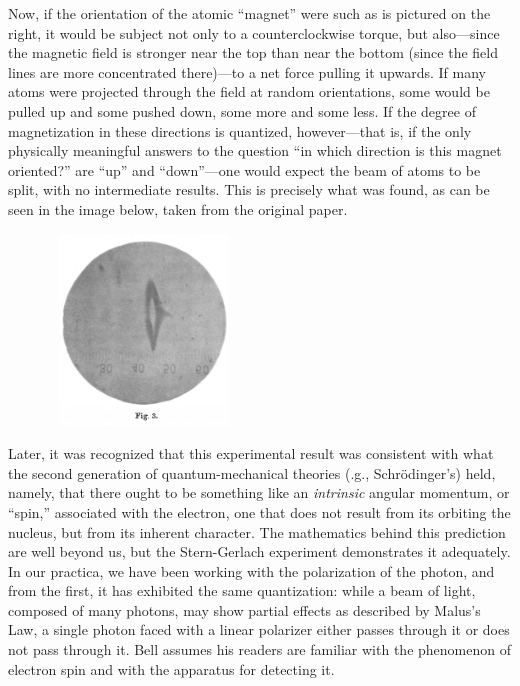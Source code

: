 Now, if the orientation of the atomic ``magnet'' were such as is pictured on the right, it would be subject not only to a counterclockwise torque, but also---since the magnetic field is stronger near the top than near the bottom (since the field lines are more concentrated there)---to a net force pulling it upwards. If many atoms were projected through the field at random orientations, some would be pulled up and some pushed down, some more and some less. If the degree of magnetization in these directions is quantized, however---that is, if the only physically meaningful answers to the question ``in which direction is this magnet oriented?'' are ``up'' and ``down''---one would expect the beam of atoms to be split, with no intermediate results. This is precisely what was found, as can be seen in the image below, taken from the original paper.

\begin{figure}[h]
  \centering
    \includegraphics[width=2.00000in,height=2.00000in]{images/17_bell/result.png}
\end{figure}

Later, it was recognized that this experimental result was consistent with what the second generation of quantum-mechanical theories (\e.g., Schr\"odinger's) held, namely, that there ought to be something like an \emph{intrinsic} angular momentum, or ``spin,'' associated with the electron, one that does not result from its orbiting the nucleus, but from its inherent character. The mathematics behind this prediction are well beyond us, but the Stern-Gerlach experiment demonstrates it adequately. In our practica, we have been working with the polarization of the photon, and from the first, it has exhibited the same quantization: while a beam of light, composed of many photons, may show partial effects as described by Malus's Law, a single photon faced with a linear polarizer either passes through it or does not pass through it. Bell assumes his readers are familiar with the phenomenon of electron spin and with the apparatus for detecting it.

